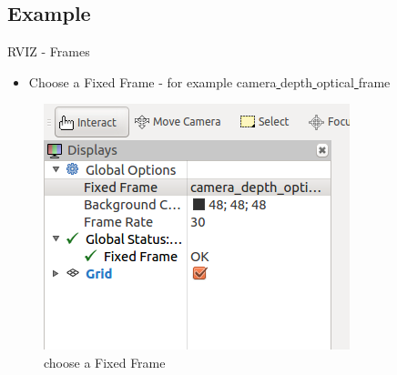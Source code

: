 \documentclass{beamer}
\begin{document}

\subsection{Example}
\begin{frame}{RVIZ - Frames}	

	\begin{itemize}
		\item Choose a Fixed Frame - for example camera\underline{ }depth\underline{ }optical\underline{ }frame
			
	\end{itemize}

	\begin{figure}[H]
		\centering
		\includegraphics[scale=0.5]{./images/RVIZ_Frame.png}
		\caption{choose a Fixed Frame}
		\label{fig:ros_add_frame}
	\end{figure}
\end{frame}
\end{document}
